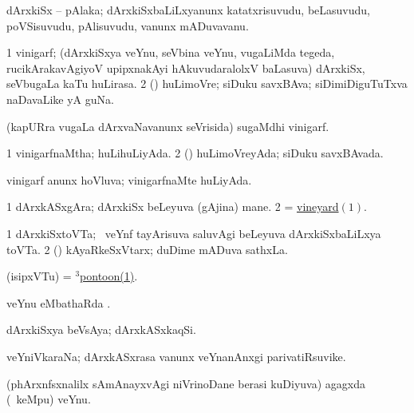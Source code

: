 \bentry
{} 
\gl{\nA}
\expl{}
\bmng
 dArxkiSx -- pAlaka; dArxkiSxbaLiLxyanunx katatxrisuvudu, beLasuvudu, poVSisuvudu, pAlisuvudu, \mo vanunx mADuvavanu. 
\emng
\eentry

\bentry
{} 
\gl{\nA}
\expl{}
\bmng
\bnum
\num{1} vinigarf; (dArxkiSxya veYnu, seVbina veYnu, \mo vugaLiMda tegeda, rucikArakavAgiyoV upipxnakAyi hAkuvudaralolxV baLasuva) dArxkiSx, seVbugaLa kaTu huLirasa. 
\num{2} (\rUpa) huLimoVre; siDuku savxBAva; siDimiDiguTuTxva naDavaLike yA guNa. 
\enum
\emng

\noindent 
\gl{\pagu}
\expl{}
\bmng
{}  (kapURra \mo vugaLa dArxvaNavanunx seVrisida) sugaMdhi vinigarf. 
\emng
\eentry

\bentry 
{} 
\gl{\gu}
\expl{}
\bmng
\bnum
\num{1} vinigarfnaMtha; huLihuLiyAda. 
\num{2} (\rUpa) huLimoVreyAda; siDuku savxBAvada. 
\enum
\emng
\eentry

\bentry
{} 
\gl{\gu}
\expl{}
\bmng
 vinigarf anunx hoVluva; vinigarfnaMte huLiyAda. 
\emng
\eentry

\bentry
{} 
\gl{\nA}
\bmng
\bnum
\num{1} dArxkASxgAra; dArxkiSx beLeyuva (gAjina) mane. 
\num{2} = \hyperlink{vineyard}{vineyard\((1)\)}. 
\enum
\emng
\eentry

\bentry
{} 
\gl{\nA}
\expl{}
\bmng
\bnum
\num{1} dArxkiSxtoVTa; \kanmu\ veYnf tayArisuva saluvAgi beLeyuva dArxkiSxbaLiLxya toVTa. 
\num{2} (\beY) kAyaRkeSxVtarx; duDime mADuva sathxLa. 
\enum
\emng
\eentry

\bentry 
{} 
\gl{\nA}
\expl{\F\ }
\bmng
 (isipxVTu) = \hyperref{kandict_p.pdf}{P}{pontoon(3)}{$^3$pontoon(1)}. 
\emng
\eentry

\bentry
{} 
\gl{\sapUpa}
\expl{}
\bmng
 veYnu eMbathaRda \sapUpa. 
\emng
\eentry

\bentry
{} 
\gl{\nA}
\expl{}
\bmng
 dArxkiSxya beVsAya; dArxkASxkaqSi. 
\emng
\eentry

\bentry
{} 
\gl{\nA}
\expl{}
\bmng
 veYniVkaraNa; dArxkASxrasa \mo vanunx veYnanAnxgi parivatiRsuvike. 
\emng
\eentry

\bentry 
{} 
\gl{\nA}
\expl{\F}
\bmng
 (phArxnfsxnalilx sAmAnayxvAgi niVrinoDane berasi kuDiyuva) agagxda (\sA\ keMpu) veYnu. 
\emng
\eentry

